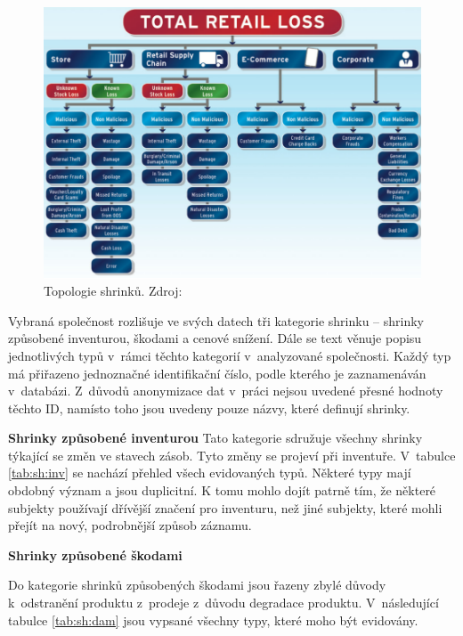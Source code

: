 \begin{figure}[hbtp!]
    \centering
    \captionsetup{justification=centering}
    \includegraphics[width=\textwidth]{obrazky/typyshirnku.png}
    \caption{Topologie shrinků. Zdroj: \cite{bib:shrink2}}
    \label{obr:shrinkytypyBeck}
\end{figure}

Vybraná společnost rozlišuje ve svých datech tři kategorie shrinku -- shrinky způsobené inventurou, škodami a cenové snížení. Dále se text věnuje popisu jednotlivých typů v~rámci těchto kategorií v~analyzované společnosti. Každý typ má přiřazeno jednoznačné identifikační číslo, podle kterého je zaznamenáván v~databázi. Z~důvodů anonymizace dat v~práci nejsou uvedené přesné hodnoty těchto ID, namísto toho jsou uvedeny pouze názvy, které definují shrinky.

\vspace*{1em}

\textbf{Shrinky způsobené inventurou}
Tato kategorie sdružuje všechny shrinky týkající se změn ve stavech zásob. Tyto změny se projeví při inventuře. V~tabulce \ref*{tab:sh:inv} se nachází přehled všech evidovaných typů. Některé typy mají obdobný význam a jsou duplicitní. K tomu mohlo dojít patrně tím, že některé subjekty používají dřívější značení pro inventuru, než jiné subjekty, které mohli přejít na nový, podrobnější způsob záznamu. 

\vspace*{1em}

\textbf{Shrinky způsobené škodami}

Do kategorie shrinků způsobených škodami jsou řazeny zbylé důvody k~odstranění produktu z~prodeje z~důvodu degradace produktu. V~následující tabulce \ref{tab:sh:dam} jsou vypsané všechny typy, které moho být evidovány.

